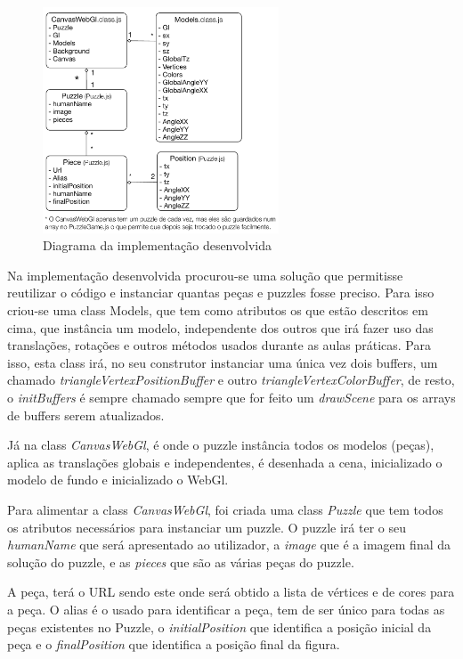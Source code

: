 \documentclass[pdftex,12pt,a4paper]{report}
\begin{document}
\begin{figure}[!htb]
\center
 \includegraphics[width=70mm,scale=1]{classes.pdf}
 \caption{Diagrama da implementação desenvolvida}
 \label{fig:decifra_livro}
\end{figure}

Na implementação desenvolvida procurou-se uma solução que permitisse reutilizar o código e instanciar quantas peças e puzzles fosse preciso. Para isso criou-se uma class Models, que tem como atributos os que estão descritos em cima, que instância um modelo, independente dos outros que irá fazer uso das translações, rotações e outros métodos usados durante as aulas práticas. Para isso, esta class irá, no seu construtor instanciar uma única vez dois buffers, um chamado \textit{triangleVertexPositionBuffer} e outro  \textit{triangleVertexColorBuffer}, de resto, o \textit{initBuffers} é sempre chamado sempre que for feito um \textit{drawScene} para os arrays de buffers serem atualizados.

Já na class \textit{CanvasWebGl}, é onde o puzzle instância todos os modelos (peças), aplica as translações globais e independentes, é desenhada a cena, inicializado o modelo de fundo e inicializado o WebGl. 

Para alimentar a class \textit{CanvasWebGl}, foi criada uma class \textit{Puzzle} que tem todos os atributos necessários para instanciar um puzzle. O puzzle irá ter o seu \textit{humanName} que será apresentado ao utilizador, a \textit{image} que é a imagem final da solução do puzzle, e as \textit{pieces} que são as várias peças do puzzle.

A peça, terá o URL sendo este onde será obtido a lista de vértices e de cores para a peça. O alias é o usado para identificar a peça, tem de ser único para todas as peças existentes no Puzzle, o \textit{initialPosition} que identifica a posição inicial da peça e o \textit{finalPosition} que identifica a posição final da figura.
\end{document}
